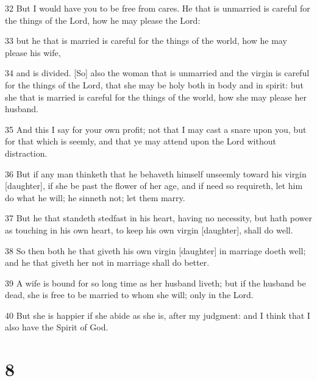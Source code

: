 \par 32 But I would have you to be free from cares. He that is unmarried is careful for the things of the Lord, how he may please the Lord:
\par 33 but he that is married is careful for the things of the world, how he may please his wife,
\par 34 and is divided. [So] also the woman that is unmarried and the virgin is careful for the things of the Lord, that she may be holy both in body and in spirit: but she that is married is careful for the things of the world, how she may please her husband.
\par 35 And this I say for your own profit; not that I may cast a snare upon you, but for that which is seemly, and that ye may attend upon the Lord without distraction.
\par 36 But if any man thinketh that he behaveth himself unseemly toward his virgin [daughter], if she be past the flower of her age, and if need so requireth, let him do what he will; he sinneth not; let them marry.
\par 37 But he that standeth stedfast in his heart, having no necessity, but hath power as touching in his own heart, to keep his own virgin [daughter], shall do well.
\par 38 So then both he that giveth his own virgin [daughter] in marriage doeth well; and he that giveth her not in marriage shall do better.
\par 39 A wife is bound for so long time as her husband liveth; but if the husband be dead, she is free to be married to whom she will; only in the Lord.
\par 40 But she is happier if she abide as she is, after my judgment: and I think that I also have the Spirit of God.

\chapter{8}

